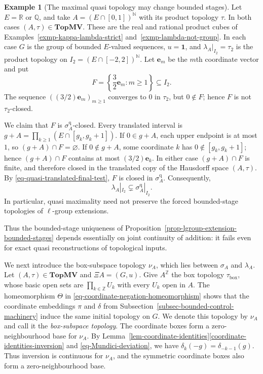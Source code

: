 \documentclass[preprint,3p]{elsarticle}
\theoremstyle{plain}
\theoremstyle{definition}
\newtheorem{exmp}[thm]{Example}
\newcommand{\TopMV}{\mathbf{TopMV}}
\numberwithin{equation}{section}
\begin{document}
\begin{exmp}[The maximal quasi topology may change bounded stages]
\label{exmp-quasi-stage-strict-left}
Let $E=\mathbb R$ or $\mathbb Q$, and take
$A=(E\cap[0,1])^{\mathbb N}$ with its product topology $\tau$.
In both cases $(A,\tau)\in\TopMV$.
These are the real and rational product cubes of
Examples~\ref{exmp-kappa-lambda-strict} and~\ref{exmp-lambda-not-group}.
In each case $G$ is the group of bounded $E$-valued sequences,
$u=\mathbf1$, and $\lambda_A|_{I_2}=\tau_2$ is the product topology on
$I_2=(E\cap[-2,2])^{\mathbb N}$.
Let $\mathbf e_m$ be the $m$th coordinate vector and put
\[
 F=\left\{\frac32\mathbf e_m:m\geq1\right\}\subseteq I_2.
\]
The sequence $((3/2)\mathbf e_m)_{m\geq1}$ converges to $0$ in $\tau_2$, but
$0\notin F$; hence $F$ is not $\tau_2$-closed.

We claim that $F$ is $\sigma_A^{\mathrm q}$-closed.
Every translated interval is
$g+A=\prod_{k\geq1}(E\cap[g_k,g_k+1])$.
If $0\in g+A$, each upper endpoint is at most $1$, so
$(g+A)\cap F=\varnothing$.  If $0\notin g+A$, some coordinate
$k$ has $0\notin[g_k,g_k+1]$; hence $(g+A)\cap F$ contains
at most $(3/2)\mathbf e_k$.
In either case $(g+A)\cap F$ is finite, and therefore closed
in the translated copy of the Hausdorff space $(A,\tau)$.
By \eqref{eq-quasi-translated-final-test}, $F$ is closed in
$\sigma_A^{\mathrm q}$.  Consequently,
\[
 \lambda_A|_{I_2}\subsetneq\sigma_A^{\mathrm q}|_{I_2}.
\]
In particular, quasi maximality need not preserve the forced
bounded-stage topologies of $\ell$-group extensions.
\end{exmp}

Thus the bounded-stage uniqueness of
Proposition~\ref{prop-lgroup-extension-bounded-stages} depends
essentially on joint continuity of addition: it fails even for
exact quasi reconstructions of topological inputs.

We next introduce the box-subspace topology $\nu_A$, which lies
between $\sigma_A$ and $\lambda_A$.
Let $(A,\tau)\in\TopMV$ and $\Xi A=(G,u)$.
Give $A^{\mathbb Z}$ the box topology $\tau_{\mathrm{box}}$,
whose basic open sets are $\prod_{k\in\mathbb Z}U_k$ with every
$U_k$ open in $A$.
The homeomorphism $\Theta$ in
\eqref{eq-coordinate-negation-homeomorphism} shows that the
coordinate embeddings $\pi$ and $\delta$ from
Subsection~\ref{subsec-bounded-control-machinery} induce the same
initial topology on $G$.  We denote this topology by $\nu_A$
and call it the \emph{box-subspace topology}.
The coordinate boxes form a zero-neighbourhood base for $\nu_A$.
By Lemma~\ref{lem-coordinate-identities}\ref{coordinate-identities-inversion}
and \eqref{eq-Mundici-deviation}, we have
$\delta_k(-g)=\delta_{-k-1}(g)$.
Thus inversion is continuous for $\nu_A$, and the symmetric
coordinate boxes also form a zero-neighbourhood base.
\end{document}
